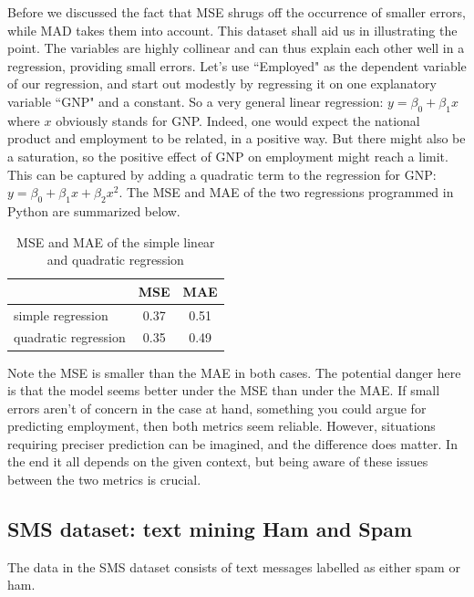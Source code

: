 \documentclass{llncs}
\begin{document}

Before we discussed the fact that MSE shrugs off the occurrence of smaller errors, while MAD takes them into account. This dataset shall aid us in illustrating the point. The variables are highly collinear and can thus explain each other well in a regression, providing small errors. Let's use ``Employed" as the dependent variable of our regression, and start out modestly by regressing it on one explanatory variable ``GNP" and a constant. So a very general linear regression: $\displaystyle y = \beta_{0} + \beta_{1}x$ where $x$ obviously stands for GNP. Indeed, one would expect the national product and employment to be related, in a positive way. But there might also be a saturation, so the positive effect of GNP on employment might reach a limit. This can be captured by adding a quadratic term to the regression for GNP: $\displaystyle y = \beta_{0} + \beta_{1}x +\beta_{2}x^{2}$. The MSE and MAE of the two regressions programmed in Python are summarized below.

\begin{table}[H]
    \centering
    \begin{tabular}{l | c | c}
        & MSE & MAE\\ \hline
        simple regression & 0.37& 0.51 \\
        quadratic regression & 0.35 & 0.49
    \end{tabular}
    \caption{MSE and MAE of the simple linear and quadratic regression}
    \label{table:MSE_vs_MAE}
\end{table}
\noindent Note the MSE is smaller than the MAE in both cases. The potential danger here is that the model seems better under the MSE than under the MAE. If small errors aren't of concern in the case at hand, something you could argue for predicting employment, then both metrics seem reliable. However, situations requiring preciser prediction can be imagined, and the difference does matter. In the end it all depends on the given context, but being aware of these issues between the two metrics is crucial.

\subsection{SMS dataset: text mining Ham and Spam}
The data in the SMS dataset consists of text messages labelled as either spam or ham.             


\end{document}
